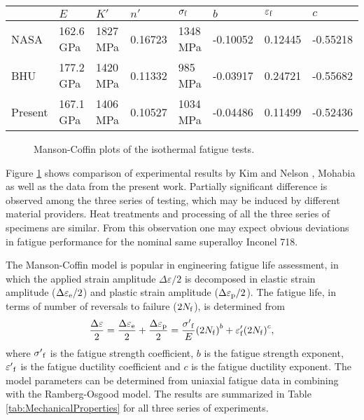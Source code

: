 \documentclass[preprint,5p,twocolumn,11pt,sort&compress]{elsarticle}
\begin{document}
\begin{table*}[htbp]
  \centering
  \caption{Basic properties of Nickel-based superalloy Inconel 718 at 650$^{\circ}$C.}
    \begin{tabular}{llllllll}
    \hline
          & $E$     & $K'$     & $n'$     & $\sigma_{\rm f}$    & $b$     & $\varepsilon_{\rm f}$    & $c$ \\
    \hline
    NASA \cite{kim1988elevated, nelson1992creep}  & 162.6 GPa & 1827 MPa  & 0.16723 & 1348 MPa & -0.10052 & 0.12445 & -0.55218 \\
    BHU \cite{Mahobia2014}   & 177.2 GPa & 1420 MPa  & 0.11332 & 985 MPa & -0.03917 & 0.24721 & -0.55682 \\
    Present   & 167.1 GPa & 1406 MPa  & 0.10527 & 1034 MPa & -0.04486 & 0.11499 & -0.52436 \\
    \hline
    \end{tabular}%
  \label{tab:MechanicalProperties}%
\end{table*}%

\begin{figure}[!htp]
\caption{Manson-Coffin plots of the isothermal fatigue tests.}
\label{Fig:Baseline}
\end{figure}

Figure \ref{Fig:Baseline} shows  comparison of experimental results by Kim \cite{kim1988elevated} and Nelson \cite{nelson1992creep}, Mohabia \cite{Mahobia2014} as well as the data from the present work. Partially significant difference is observed among the three series of testing, which may be induced by different material providers. Heat treatments and processing of all the three series of specimens are similar. From this observation one may expect obvious deviations in fatigue performance for the nominal same superalloy Inconel 718. 

The Manson-Coffin model is popular in engineering fatigue life assessment, in which the applied strain amplitude $\Delta \varepsilon/2$ is decomposed in elastic strain amplitude ($\Delta \varepsilon_{\rm e}/2$) and plastic strain amplitude ($\Delta \varepsilon_{\rm p}/2$). The fatigue life, in terms of number of reversals to failure ($2N_{\rm f}$), is determined from
\begin{equation}
\frac{{\Delta \varepsilon }}{2} = \frac{{\Delta {\varepsilon _{\rm e}}}}{2} + \frac{{\Delta {\varepsilon _{\rm p}}}}{2} = \frac{{{{\sigma '}_{\rm f}}}}{E}{\left( {2{N_{\rm f}}} \right)^b} + {\varepsilon '_{\rm f}}{\left( {2{N_{\rm f}}} \right)^c},
\label{Equ:CoffinManson}
\end{equation}
where ${{{\sigma '}_{\rm f}}}$ is the fatigue strength coefficient, $b$ is the fatigue strength exponent, ${{{\varepsilon '}_{\rm f}}}$ is the fatigue ductility coefficient and $c$ is the fatigue ductility exponent. The model parameters can be determined from uniaxial fatigue data in combining with the Ramberg-Osgood model. The results are summarized in Table \ref{tab:MechanicalProperties} for all three series of experiments.
\end{document}
